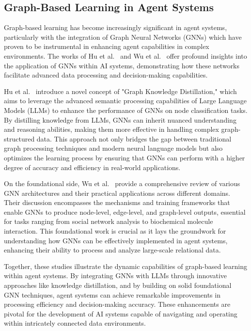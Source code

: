 \subsection{Graph-Based Learning in Agent Systems}
Graph-based learning has become increasingly significant in agent systems, particularly with the integration of Graph Neural Networks (GNNs) which have proven to be instrumental in enhancing agent capabilities in complex environments. The works of Hu et al.~\cite{hu2024large} and Wu et al.~\cite{Wu_2021} offer profound insights into the application of GNNs within AI systems, demonstrating how these networks facilitate advanced data processing and decision-making capabilities.

Hu et al.~\cite{hu2024large} introduce a novel concept of "Graph Knowledge Distillation," which aims to leverage the advanced semantic processing capabilities of Large Language Models (LLMs) to enhance the performance of GNNs on node classification tasks. By distilling knowledge from LLMs, GNNs can inherit nuanced understanding and reasoning abilities, making them more effective in handling complex graph-structured data. This approach not only bridges the gap between traditional graph processing techniques and modern neural language models but also optimizes the learning process by ensuring that GNNs can perform with a higher degree of accuracy and efficiency in real-world applications.

On the foundational side, Wu et al.~\cite{Wu_2021} provide a comprehensive review of various GNN architectures and their practical applications across different domains. Their discussion encompasses the mechanisms and training frameworks that enable GNNs to produce node-level, edge-level, and graph-level outputs, essential for tasks ranging from social network analysis to biochemical molecule interaction. This foundational work is crucial as it lays the groundwork for understanding how GNNs can be effectively implemented in agent systems, enhancing their ability to process and analyze large-scale relational data.

Together, these studies illustrate the dynamic capabilities of graph-based learning within agent systems. By integrating GNNs with LLMs through innovative approaches like knowledge distillation, and by building on solid foundational GNN techniques, agent systems can achieve remarkable improvements in processing efficiency and decision-making accuracy. These enhancements are pivotal for the development of AI systems capable of navigating and operating within intricately connected data environments.


